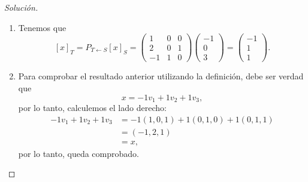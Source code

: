 \documentclass[a4,11pt]{aleph-notas}
\begin{document}
\begin{proof}[Solución]
\begin{enumerate}[leftmargin=*]
\[    \]
    De donde obtenemos que
    \[
        [u_1]_T
        = \begin{pmatrix}
            1\\2\\-1
        \end{pmatrix},
        \qquad
        [u_2]_T
        = \begin{pmatrix}
            0\\0\\1
        \end{pmatrix}
        \texty
        [u_3]_T
        = \begin{pmatrix}
            0\\1\\0
        \end{pmatrix}.
    \]
    Con esto, tenemos que
    \[
        P_{T\leftarrow S} = 
        \begin{pmatrix}
        [u_1]_T & [u_2]_T & [u_3]_T
        \end{pmatrix}
        =
        \begin{pmatrix}
             1 & 0 & 0\\
             2 & 0 & 1\\
            -1 & 1 & 0
        \end{pmatrix}.
    \]
\item
    Tenemos que
    \[
        [x]_T = P_{T\leftarrow S} [x]_S
        =
        \begin{pmatrix}
             1 & 0 & 0\\
             2 & 0 & 1\\
            -1 & 1 & 0
        \end{pmatrix}
        \begin{pmatrix} -1\\ 0 \\ 3 \end{pmatrix}
        =
        \begin{pmatrix} -1\\ 1 \\ 1 \end{pmatrix}.
    \]
\item
    Para comprobar el resultado anterior utilizando la definición, debe ser verdad que
    \[
        x = -1v_1 + 1v_2 + 1v_3,
    \]
    por lo tanto, calculemos el lado derecho:
    \begin{align*}
        -1v_1 + 1v_2 + 1v_3
        & = -1(1,0,1) + 1(0,1,0) + 1(0,1,1)\\
        & = (-1,2,1)\\
        & = x,
    \end{align*}
    por lo tanto, queda comprobado.\qedhere
\end{enumerate}
\end{proof}
\end{document}
